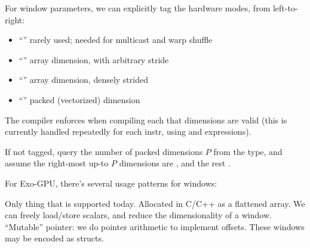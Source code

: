 


\filbreak




\filbreak
For window parameters, we can explicitly tag the hardware modes, from left-to-right:
\begin{itemize}
  \item ``'' rarely used; needed for multicast and warp shuffle
  \filbreak
  \item ``'' array dimension, with arbitrary stride
  \filbreak
  \item ``'' array dimension, densely strided
  \filbreak
  \item ``'' packed (vectorized) dimension
\end{itemize}

\filbreak
The compiler enforces when compiling each  that  dimensions are valid (this is currently handled repeatedly for each instr, using  and  expressions).

\filbreak
{} If not tagged, query the number of packed dimensions $P$ from the  type, and assume the right-most up-to $P$ dimensions are , and the rest .

\filbreak
{}



\filbreak
{}



\filbreak
{}



\filbreak
{}

For Exo-GPU, there's several usage patterns for windows:

\filbreak
{} Only thing that is supported today.
Allocated in C/C++ as a flattened array.
We can freely load/store scalars, and reduce the dimensionality of a window.
``Mutable'' pointer: we do pointer arithmetic to implement offsets.
These windows may be encoded as structs.



